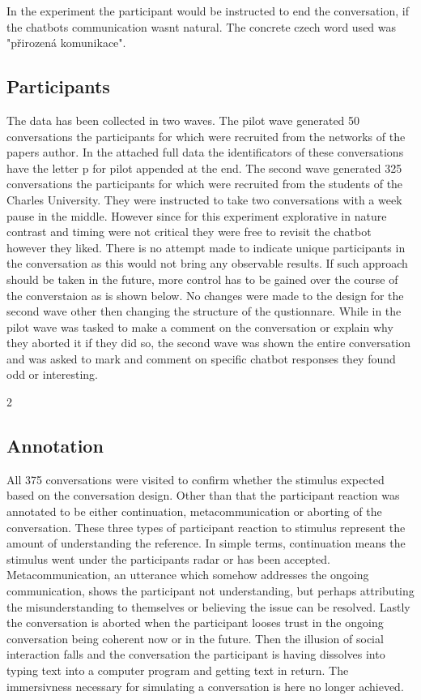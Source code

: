 In the experiment the participant would be instructed to end the conversation,
if the chatbots communication wasnt natural.
The concrete czech word used was "přirozená komunikace".

\subsection{Participants}
The data has been collected in two waves.
The pilot wave generated 50 conversations
the participants for which were recruited from the networks of the papers author.
In the attached full data
the identificators of these conversations have
the letter p for pilot appended at the end.
The second wave generated 325 conversations
the participants for which were recruited from the students of the Charles University.
They were instructed to take two conversations with a week pause in the middle.
However since for this experiment explorative in nature contrast and timing were not critical
they were free to revisit the chatbot however they liked.
There is no attempt made to indicate unique participants in the conversation as
this would not bring any observable results.
If such approach should be taken in the future,
more control has to be gained over the course of the converstaion
as is shown below.
No changes were made to the design for the second wave other then changing the structure of the qustionnare.
While in the pilot wave was tasked to make a comment on the conversation or
explain why they aborted it if they did so,
the second wave was shown the entire conversation
and was asked to mark and comment on specific chatbot responses they found odd or interesting.

2
\subsection{Annotation}

All 375 conversations were visited to confirm whether
the stimulus expected based on the conversation design.
Other than that the participant reaction was annotated to be either
continuation, metacommunication or aborting of the conversation.
These three types of participant reaction to stimulus
represent the amount of understanding the reference.
In simple terms, continuation means
the stimulus went under the participants radar
or has been accepted.
Metacommunication, an utterance which somehow addresses the ongoing communication,
shows the participant not understanding,
but perhaps attributing the misunderstanding to themselves or
believing the issue can be resolved.
Lastly the conversation is aborted when the participant looses trust
in the ongoing conversation being coherent now or in the future.
Then the illusion of social interaction falls
and the conversation the participant is having dissolves into
typing text into a computer program and getting text in return.
The immersivness necessary for simulating a conversation is here no longer achieved.

